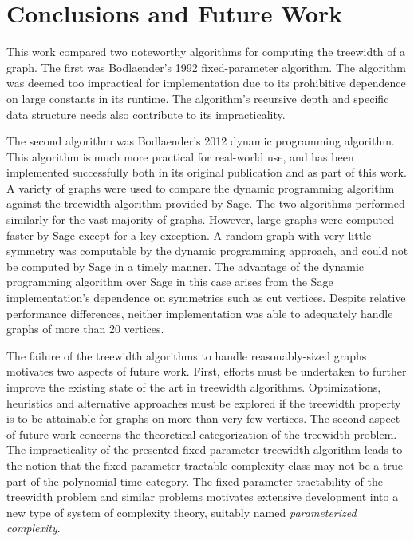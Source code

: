 \documentclass[12pt,conference]{IEEEtran}
\theoremstyle{plain}
\begin{document}
\section{Conclusions and Future Work}

This work compared two noteworthy algorithms for computing the treewidth of a graph. The first was Bodlaender's 1992 fixed-parameter algorithm. The algorithm was deemed too impractical for implementation due to its prohibitive dependence on large constants in its runtime. The algorithm's recursive depth and specific data structure needs also contribute to its impracticality.

The second algorithm was Bodlaender's 2012 dynamic programming algorithm. This algorithm is much more practical for real-world use, and has been implemented successfully both in its original publication and as part of this work. A variety of graphs were used to compare the dynamic programming algorithm against the treewidth algorithm provided by Sage. The two algorithms performed similarly for the vast majority of graphs. However, large graphs were computed faster by Sage except for a key exception. A random graph with very little symmetry was computable by the dynamic programming approach, and could not be computed by Sage in a timely manner. The advantage of the dynamic programming algorithm over Sage in this case arises from the Sage implementation's dependence on symmetries such as cut vertices. Despite relative performance differences, neither implementation was able to adequately handle graphs of more than 20 vertices. 

The failure of the treewidth algorithms to handle reasonably-sized graphs motivates two aspects of future work. First, efforts must be undertaken to further improve the existing state of the art in treewidth algorithms. Optimizations, heuristics and alternative approaches must be explored if the treewidth property is to be attainable for graphs on more than very few vertices. The second aspect of future work concerns the theoretical categorization of the treewidth problem. The impracticality of the presented fixed-parameter treewidth algorithm leads to the notion that the fixed-parameter tractable complexity class may not be a true part of the polynomial-time category. The fixed-parameter tractability of the treewidth problem and similar problems motivates extensive development into a new type of system of complexity theory, suitably named \textit{parameterized complexity}.
\end{document}
